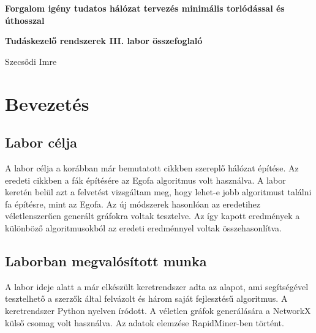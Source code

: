 \documentclass[12pt]{report}
\begin{document}
\begin{titlepage}
	\begin{center}
		\vspace*{1cm}
		
		\textbf{\LARGE 
			Forgalom igény tudatos hálózat tervezés minimális torlódással és úthosszal
		}
	
	
		\vspace{0.5cm}
	
		\textbf{\normalsize Tudáskezelő rendszerek III. labor összefoglaló}
		
		\vfill
		
		\Large Szecsődi Imre
		
		\vspace{2.8cm}
		
		\the\year
		
	\end{center}
\end{titlepage}

\tableofcontents
	
\chapter{Bevezetés}


\section{Labor célja}

A labor célja a korábban már bemutatott cikkben\cite{avin_demand-aware_nodate} szereplő hálózat építése.
Az eredeti cikkben a fák építésére az Egofa algoritmus volt használva. 
A labor keretén belül azt a felvetést vizsgáltam meg, hogy lehet-e jobb algoritmust találni fa építésre, mint az Egofa.  
Az új módszerek hasonlóan az eredetihez véletlenszerűen generált gráfokra voltak tesztelve.
Az így kapott eredmények a különböző algoritmusokból az eredeti eredménnyel voltak összehasonlítva.

\section{Laborban megvalósított munka}

A labor ideje alatt a már elkészült keretrendszer adta az alapot, ami segítségével tesztelhető a szerzők által felvázolt és három saját fejlesztésű algoritmus.
A keretrendszer Python \cite{noauthor_python_nodate} nyelven íródott.
A véletlen gráfok generálására a NetworkX külső csomag volt használva\cite{noauthor_networkx_nodate}.
Az adatok elemzése RapidMiner-ben történt\cite{noauthor_lightning_nodate}.
\end{document}
